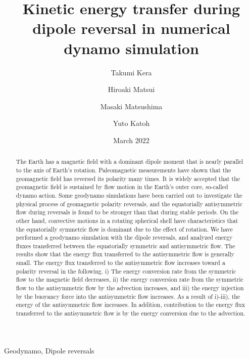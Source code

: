 \documentclass[review]{elsarticle}
\date{March 2022}
\begin{document}
\title{Kinetic energy transfer during dipole reversal in numerical dynamo simulation}

\author[Tohoku]{Takumi Kera}
\author[ucd]{Hiroaki Matsui}
\author[TITECH]{Masaki Matsushima}
\author[Tohoku]{Yuto Katoh}

\address[Tohoku]{Department of Geophysics, Tohoku University, Sendai, Japan.}
\address[ucd]{Department of the Earth and Planetary Sciences, University of California, Davis, CA, USA.}
\address[TITECH]{Department of Earth and Planetary Sciences, Tokyo Institute of Technology, Tokyo, Japan.}

\begin{keyword}
Geodynamo, Dipole reversals
\end{keyword}

\begin{abstract}
The Earth has a magnetic field with a dominant dipole moment that is nearly parallel to the axis of Earth’s rotation. 
Paleomagnetic measurements have shown that the geomagnetic field has reversed its polarity many times. It is widely accepted that the geomagnetic field is sustained by flow motion in the Earth’s outer core, so-called dynamo action. 
Some geodynamo simulations have been carried out to investigate the physical process of geomagnetic polarity reversals, and the equatorially antisymmetric flow during reversals is found to be stronger than that during stable periods. 
On the other hand, convective motions in a rotating spherical shell have characteristics that the equatorially symmetric flow is dominant due to the effect of rotation. 
We have performed a geodynamo simulation with the dipole reversals, and  analyzed energy fluxes transferred between the equatorially symmetric and antisymmetric flow. 
The results show that the energy flux transferred to the antisymmetric flow is generally small. 
The energy flux transferred to the antisymmetric flow increases toward a polarity reversal in the following. i) The energy conversion rate from the symmetric flow to the magnetic field decreases, ii) the energy conversion rate from the symmetric flow to the antisymmetric flow by the advection increases, and iii) the energy injection by the buoyancy force into the antisymmetric flow increases. 
As a result of i)-iii), the energy of the antisymmetric flow increases. 
In addition, contribution to the energy flux transferred to the antisymmetric flow is by the energy conversion due to the advection.
\end{abstract}

\maketitle












%

\end{document}
